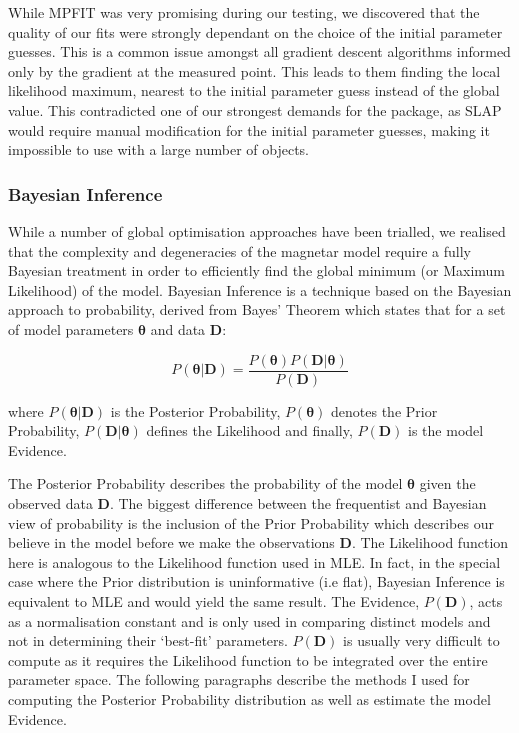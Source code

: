 While \textsc{MPFIT} was very promising during our testing, we discovered that the quality of our fits were strongly dependant on the choice of the initial parameter guesses. This is a common issue amongst all gradient descent algorithms informed only by the gradient at the measured point. This leads to them finding the local likelihood maximum, nearest to the initial parameter guess instead of the global value. This contradicted one of our strongest demands for the package, as \textsc{SLAP} would require manual modification for the initial parameter guesses, making it impossible to use with a large number of objects.

\subsubsection{Bayesian Inference}
While a number of global optimisation approaches have been trialled, we realised that the complexity and degeneracies of the magnetar model require a fully Bayesian treatment in order to efficiently find the global minimum (or Maximum Likelihood) of the model. Bayesian Inference is a technique based on the Bayesian approach to probability, derived from Bayes' Theorem which states that for a set of model parameters $\mathbf{\theta}$ and data $\mathbf{D}$:

\begin{equation}
  P(\mathbf{\theta}|\mathbf{D}) = \frac{P(\mathbf{\theta}) P(\mathbf{D}|\mathbf{\theta})}{P(\mathbf{D})}
\end{equation}

\noindent where $P(\mathbf{\theta}|\mathbf{D})$ is the Posterior Probability, $P(\mathbf{\theta})$ denotes the Prior Probability, $P(\mathbf{D}|\mathbf{\theta})$ defines the Likelihood and finally, $P(\mathbf{D})$ is the model Evidence.

The Posterior Probability describes the probability of the model $\mathbf{\theta}$ given the observed data $\mathbf{D}$. The biggest difference between the frequentist and Bayesian view of probability is the inclusion of the Prior Probability which describes our believe in the model before we make the observations $\textbf{D}$. The Likelihood function here is analogous to the Likelihood function used in MLE. In fact, in the special case where the Prior distribution is uninformative (i.e flat), Bayesian Inference is equivalent to MLE and would yield the same result. The Evidence, $P(\mathbf{D})$, acts as a normalisation constant and is only used in comparing distinct models and not in determining their `best-fit' parameters. $P(\mathbf{D})$ is usually very difficult to compute as it requires the Likelihood function to be integrated over the entire parameter space. The following paragraphs describe the methods I used for computing the Posterior Probability distribution as well as estimate the model Evidence.

